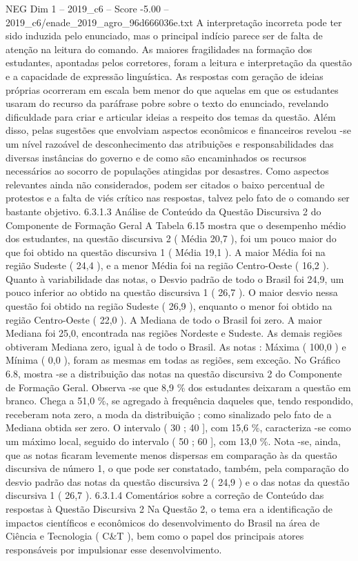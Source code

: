 \begin{textsample}{NEG Dim 1 – 2019\_c6 – Score -5.00 – 2019\_c6/enade\_2019\_agro\_96d666036e.txt}
A interpretação incorreta pode ter sido induzida pelo enunciado, mas o principal indício parece ser de falta de atenção na leitura do comando.
As maiores fragilidades na formação dos estudantes, apontadas pelos corretores, foram a leitura e interpretação da questão e a capacidade de expressão linguística.
As respostas com geração de ideias próprias ocorreram em escala bem menor do que aquelas em que os estudantes usaram do recurso da paráfrase pobre sobre o texto do enunciado, revelando dificuldade para criar e articular ideias a respeito dos temas da questão.
Além disso, pelas sugestões que envolviam aspectos econômicos e financeiros revelou -se um nível razoável de desconhecimento das atribuições e responsabilidades das diversas instâncias do governo e de como são encaminhados os recursos necessários ao socorro de populações atingidas por desastres.
Como aspectos relevantes ainda não considerados, podem ser citados o baixo percentual de protestos e a falta de viés crítico nas respostas, talvez pelo fato de o comando ser bastante objetivo. 6.3.1.3 Análise de Conteúdo da Questão Discursiva 2 do Componente de Formação Geral A Tabela 6.15 mostra que o desempenho médio dos estudantes, na questão discursiva 2 ( Média 20,7 ), foi um pouco maior do que foi obtido na questão discursiva 1 ( Média 19,1 ).
A maior Média foi na região Sudeste ( 24,4 ), e a menor Média foi na região Centro-Oeste ( 16,2 ).
Quanto à variabilidade das notas, o Desvio padrão de todo o Brasil foi 24,9, um pouco inferior ao obtido na questão discursiva 1 ( 26,7 ).
O maior desvio nessa questão foi obtido na região Sudeste ( 26,9 ), enquanto o menor foi obtido na região Centro-Oeste ( 22,0 ).
A Mediana de todo o Brasil foi zero.
A maior Mediana foi 25,0, encontrada nas regiões Nordeste e Sudeste.
As demais regiões obtiveram Mediana zero, igual à de todo o Brasil.
As notas : Máxima ( 100,0 ) e Mínima ( 0,0 ), foram as mesmas em todas as regiões, sem exceção.
No Gráfico 6.8, mostra -se a distribuição das notas na questão discursiva 2 do Componente de Formação Geral.
Observa -se que 8,9 \% dos estudantes deixaram a questão em branco.
Chega a 51,0 \%, se agregado à frequência daqueles que, tendo respondido, receberam nota zero, a moda da distribuição ; como sinalizado pelo fato de a Mediana obtida ser zero.
O intervalo ( 30 ; 40 ], com 15,6 \%, caracteriza -se como um máximo local, seguido do intervalo ( 50 ; 60 ], com 13,0 \%.
Nota -se, ainda, que as notas ficaram levemente menos dispersas em comparação às da questão discursiva de número 1, o que pode ser constatado, também, pela comparação do desvio padrão das notas da questão discursiva 2 ( 24,9 ) e o das notas da questão discursiva 1 ( 26,7 ). 6.3.1.4 Comentários sobre a correção de Conteúdo das respostas à Questão Discursiva 2 Na Questão 2, o tema era a identificação de impactos científicos e econômicos do desenvolvimento do Brasil na área de Ciência e Tecnologia ( C\&T ), bem como o papel dos principais atores responsáveis por impulsionar esse desenvolvimento.

\end{textsample}
